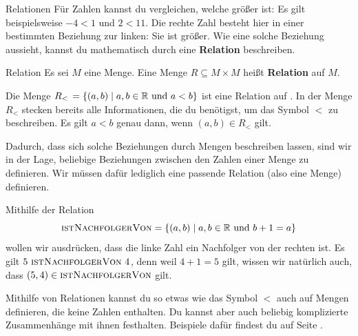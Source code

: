 \documentclass[../../main.tex]{subfiles}
\begin{document}
\begin{advanced}{Relationen}
    Für Zahlen kannst du vergleichen, welche größer ist: Es gilt beispielsweise $-4<1$ und $2<11$. Die rechte Zahl besteht hier in einer bestimmten Beziehung zur linken: Sie ist größer. Wie eine solche Beziehung aussieht, kannst du mathematisch durch eine \textbf{Relation} beschreiben.

    \begin{definition}{Relation}
        Es sei $M$ eine Menge. Eine Menge $R\subseteq M \times M$ heißt \textbf{Relation} auf $M$.
    \end{definition}

    Die Menge $R_<\,=\{(a,b)\mid a,b\in\mathbb{R}~\text{und}~a<b\}$ ist eine Relation auf \Real. In der Menge $R_<$ stecken bereits alle Informationen, die du benötigst, um das Symbol $<$ zu beschreiben. Es gilt $a<b$ genau dann, wenn $(a,b)\in R_<$ gilt.

    Dadurch, dass sich solche Beziehungen durch Mengen beschreiben lassen, sind wir in der Lage, beliebige Beziehungen zwischen den Zahlen einer Menge zu definieren. Wir müssen dafür lediglich eine passende Relation (also eine Menge) definieren.

    \begin{advexample}{}
        Mithilfe der Relation \[\textsc{istNachfolgerVon}=\{(a,b)\mid a,b\in\mathbb{R}\text{~und~}b+1=a\}\]
        wollen wir ausdrücken, dass die linke Zahl ein Nachfolger von der rechten ist. Es gilt $5~\textsc{istNachfolgerVon}~4$, denn weil $4+1=5$ gilt, wissen wir natürlich auch, dass $(5,4)\in\textsc{istNachfolgerVon}$ gilt.
    \end{advexample}
    Mithilfe von Relationen kannst du so etwas wie das Symbol $<$ auch auf Mengen definieren, die keine Zahlen enthalten. Du kannst aber auch beliebig komplizierte Zusammenhänge mit ihnen festhalten. Beispiele dafür findest du auf Seite \pageref{relationen}.
\end{advanced}
\end{document}
